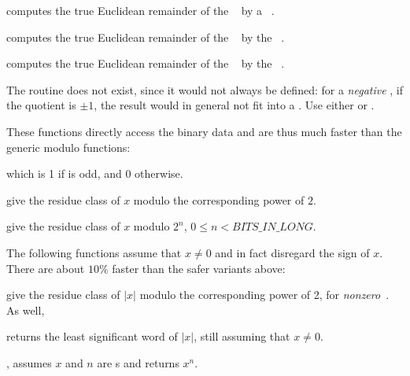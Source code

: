  computes the true Euclidean
remainder of the ~ by a ~.

 computes the true Euclidean
remainder of the ~ by the ~.

 computes the true Euclidean
remainder of the ~ by the ~.

The routine  does not exist, since it would not always be
defined: for a \emph{negative} , if the quotient is $\pm1$, the result
 would in general not fit into a . Use either
 or .

These functions directly access the binary data and are thus much faster than
the generic modulo functions:

 which is 1 if  is odd, and 0 otherwise.






 give the residue class of $x$ modulo the
corresponding power of $2$.

 give the residue class of $x$ modulo
$2^n$, $0 \leq n < BITS\_IN\_LONG$.

The following functions assume that $x\neq 0$ and in fact disregard the
sign of $x$. There are about $10\%$ faster than the safer variants above:






 give the residue class of $|x|$ modulo the
corresponding power of 2, for \emph{nonzero}~. As well,

 returns the least significant word of $|x|$, still
assuming that $x\neq 0$.


, assumes $x$ and $n$ are s and
returns $x^n$.


